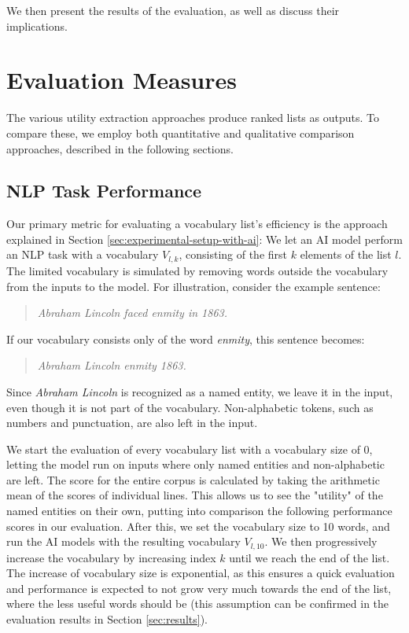 We then present the results of the evaluation, as well as discuss their implications.

\section{Evaluation Measures}

The various utility extraction approaches produce ranked lists as outputs.
To compare these, we employ both quantitative and qualitative comparison approaches, described in the following sections.

\subsection{NLP Task Performance}
Our primary metric for evaluating a vocabulary list's efficiency is the approach explained in Section \ref{sec:experimental-setup-with-ai}:
We let an AI model perform an NLP task with a vocabulary $V_{l, k}$, consisting of the first $k$ elements of the list $l$.
The limited vocabulary is simulated by removing words outside the vocabulary from the inputs to the model.
For illustration, consider the example sentence:

\begin{quote}
	\textit{Abraham Lincoln faced enmity in 1863.}
\end{quote}

If our vocabulary consists only of the word \textit{enmity}, this sentence becomes:

\begin{quote}
	\textit{Abraham Lincoln enmity 1863.}
\end{quote}

Since \textit{Abraham Lincoln} is recognized as a named entity, we leave it in the input, even though it is not part of the vocabulary.
Non-alphabetic tokens, such as numbers and punctuation, are also left in the input.


We start the evaluation of every vocabulary list with a vocabulary size of 0, letting the model run on inputs where only named entities and non-alphabetic are left.
The score for the entire corpus is calculated by taking the arithmetic mean of the scores of individual lines.
This allows us to see the "utility" of the named entities on their own, putting into comparison the following performance scores in our evaluation.
After this, we set the vocabulary size to 10 words, and run the AI models with the resulting vocabulary $V_{l, 10}$.
We then progressively increase the vocabulary by increasing index $k$ until we reach the end of the list.
The increase of vocabulary size is exponential, as this ensures a quick evaluation and performance is expected to not grow very much towards the end of the list, where the less useful words should be (this assumption can be confirmed in the evaluation results in Section \ref{sec:results}).

